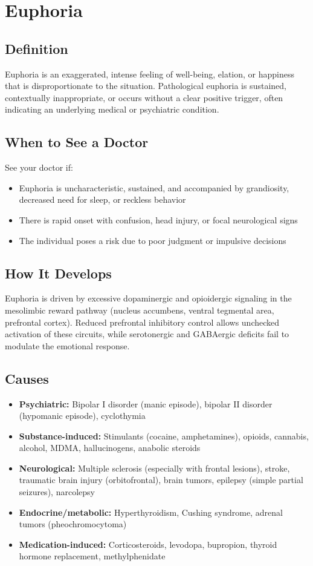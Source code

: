 \chapter{Euphoria}

\section*{Definition}
Euphoria is an exaggerated, intense feeling of well-being, elation, or happiness that is disproportionate to the situation. Pathological euphoria is sustained, contextually inappropriate, or occurs without a clear positive trigger, often indicating an underlying medical or psychiatric condition.

\section*{When to See a Doctor}
See your doctor if:
\begin{itemize}
  \item Euphoria is uncharacteristic, sustained, and accompanied by grandiosity, decreased need for sleep, or reckless behavior
  \item There is rapid onset with confusion, head injury, or focal neurological signs
  \item The individual poses a risk due to poor judgment or impulsive decisions
\end{itemize}

\section*{How It Develops}
Euphoria is driven by excessive dopaminergic and opioidergic signaling in the mesolimbic reward pathway (nucleus accumbens, ventral tegmental area, prefrontal cortex). Reduced prefrontal inhibitory control allows unchecked activation of these circuits, while serotonergic and GABAergic deficits fail to modulate the emotional response.

\section*{Causes}
\begin{itemize}
  \item \textbf{Psychiatric:} Bipolar I disorder (manic episode), bipolar II disorder (hypomanic episode), cyclothymia
  \item \textbf{Substance-induced:} Stimulants (cocaine, amphetamines), opioids, cannabis, alcohol, MDMA, hallucinogens, anabolic steroids
  \item \textbf{Neurological:} Multiple sclerosis (especially with frontal lesions), stroke, traumatic brain injury (orbitofrontal), brain tumors, epilepsy (simple partial seizures), narcolepsy
  \item \textbf{Endocrine/metabolic:} Hyperthyroidism, Cushing syndrome, adrenal tumors (pheochromocytoma)
  \item \textbf{Medication-induced:} Corticosteroids, levodopa, bupropion, thyroid hormone replacement, methylphenidate
\end{itemize}

